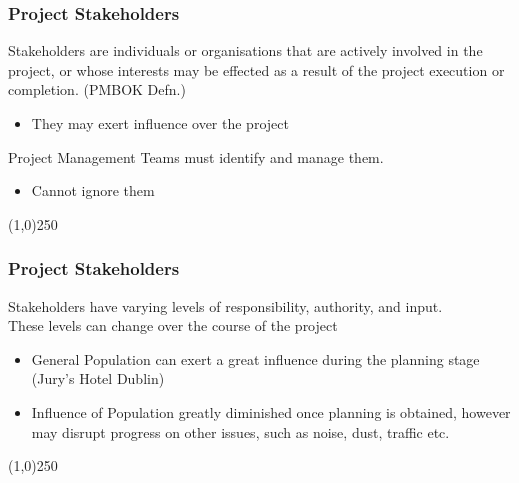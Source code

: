 \begin{frame}
\frametitle{Project Stakeholders}
Stakeholders are individuals or organisations that are actively involved in the project, or whose interests may be effected as a result of the project execution or completion. (PMBOK Defn.)\\
\begin{itemize}
	\item They may exert influence over the project
\end{itemize}
Project Management Teams must identify and manage them.
\begin{itemize}
	\item Cannot ignore them 
\end{itemize}
\end{frame}
\begin{center}\line(1,0){250}\end{center}



\begin{frame}
\frametitle{Project Stakeholders}
Stakeholders have varying levels of responsibility, authority, and input.\\
These levels can change over the course of the project\\
\begin{itemize}
	\item General Population can exert a great influence during the planning stage (Jury's Hotel Dublin)
	\item Influence of Population greatly diminished once planning is obtained, however may disrupt progress on other issues, such as noise, dust, traffic etc.
\end{itemize}
\end{frame}
\begin{center}\line(1,0){250}\end{center}



